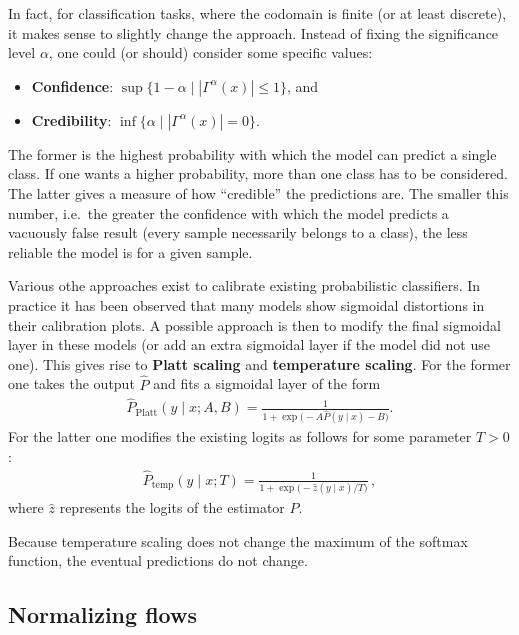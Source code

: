    In fact, for classification tasks, where the codomain is finite (or at least discrete), it makes sense to slightly change the approach. Instead of fixing the significance level $\alpha$, one could (or should) consider some specific values:
    \begin{itemize}
        \item\textbf{Confidence}: $\sup\{1-\alpha\mid|\Gamma^\alpha(x)|\leq1\}$, and
        \item\textbf{Credibility}: $\inf\{\alpha\mid|\Gamma^\alpha(x)|=0\}$.
    \end{itemize}
    The former is the highest probability with which the model can predict a single class. If one wants a higher probability, more than one class has to be considered. The latter gives a measure of how ``credible'' the predictions are. The smaller this number, i.e.~the greater the confidence with which the model predicts a vacuously false result (every sample necessarily belongs to a class), the less reliable the model is for a given sample.

    Various othe approaches exist to calibrate existing probabilistic classifiers. In practice it has been observed that many models show sigmoidal distortions in their calibration plots. A possible approach is then to modify the final sigmoidal layer in these models (or add an extra sigmoidal layer if the model did not use one). This gives rise to \textbf{Platt scaling} and \textbf{temperature scaling}. For the former one takes the output $\hat{P}$ and fits a sigmoidal layer of the form
    \begin{gather}
        \hat{P}_\text{Platt}(y\mid x;A,B) = \frac{1}{1+\exp\big(-A\hat{P}(y\mid x)-B\big)}.
    \end{gather}
    For the latter one modifies the existing logits as follows for some parameter $T>0$:
    \begin{gather}
        \hat{P}_\text{temp}(y\mid x;T) = \frac{1}{1+\exp\big(-\hat{z}(y\mid x)/T\big)}\,,
    \end{gather}
    where $\hat{z}$ represents the logits of the estimator $\hat{P}$.

    \begin{remark}[Accuracy]
        Because temperature scaling does not change the maximum of the softmax function, the eventual predictions do not change.
    \end{remark}

\subsection{Normalizing flows}

